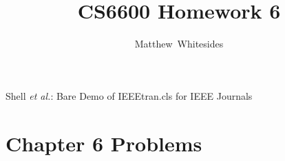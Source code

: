 \documentclass[journal,onecolumn]{IEEEtran}
\begin{document}
%
\title{CS6600 Homework 6}

%
%
%
\author{Matthew~Whitesides}%

%
{Shell \MakeLowercase{\textit{et al.}}: Bare Demo of IEEEtran.cls for IEEE Journals}

\maketitle


\IEEEpeerreviewmaketitle

\section{Chapter 6 Problems}
\end{document}
